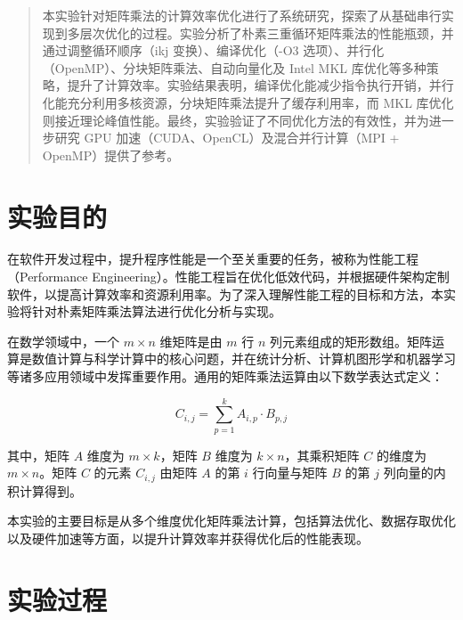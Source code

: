 \documentclass[a4paper, utf8]{ctexart}
\begin{document}
	\maketitle
	
	\renewcommand{\abstractname}{\large \textbf{摘要}}
	\begin{abstract}
		本实验针对矩阵乘法的计算效率优化进行了系统研究，探索了从基础串行实现到多层次优化的过程。实验分析了朴素三重循环矩阵乘法的性能瓶颈，并通过调整循环顺序（ikj 变换）、编译优化（-O3 选项）、并行化（OpenMP）、分块矩阵乘法、自动向量化及 Intel MKL 库优化等多种策略，提升了计算效率。实验结果表明，编译优化能减少指令执行开销，并行化能充分利用多核资源，分块矩阵乘法提升了缓存利用率，而 MKL 库优化则接近理论峰值性能。最终，实验验证了不同优化方法的有效性，并为进一步研究 GPU 加速（CUDA、OpenCL）及混合并行计算（MPI + OpenMP）提供了参考。
		
	\end{abstract}
	
	\section{实验目的}
	
	在软件开发过程中，提升程序性能是一个至关重要的任务，被称为性能工程（Performance Engineering）。性能工程旨在优化低效代码，并根据硬件架构定制软件，以提高计算效率和资源利用率。为了深入理解性能工程的目标和方法，本实验将针对朴素矩阵乘法算法进行优化分析与实现。
	
	在数学领域中，一个 $m \times n$ 维矩阵是由 $m$ 行 $n$ 列元素组成的矩形数组。矩阵运算是数值计算与科学计算中的核心问题，并在统计分析、计算机图形学和机器学习等诸多应用领域中发挥重要作用。通用的矩阵乘法运算由以下数学表达式定义：
	
	\vspace{-.75em}
	\begin{equation}
		C_{i,j} = \sum_{p=1}^{k} A_{i,p} \cdot B_{p,j}	\nonumber
	\end{equation}
	
	其中，矩阵 $A$ 维度为 $m \times k$，矩阵 $B$ 维度为 $k \times n$，其乘积矩阵 $C$ 的维度为 $m \times n$。矩阵 $C$ 的元素 $C_{i,j}$ 由矩阵 $A$ 的第 $i$ 行向量与矩阵 $B$ 的第 $j$ 列向量的内积计算得到。
	
	本实验的主要目标是从多个维度优化矩阵乘法计算，包括算法优化、数据存取优化以及硬件加速等方面，以提升计算效率并获得优化后的性能表现。
	
	\section{实验过程}
	
\end{document}
